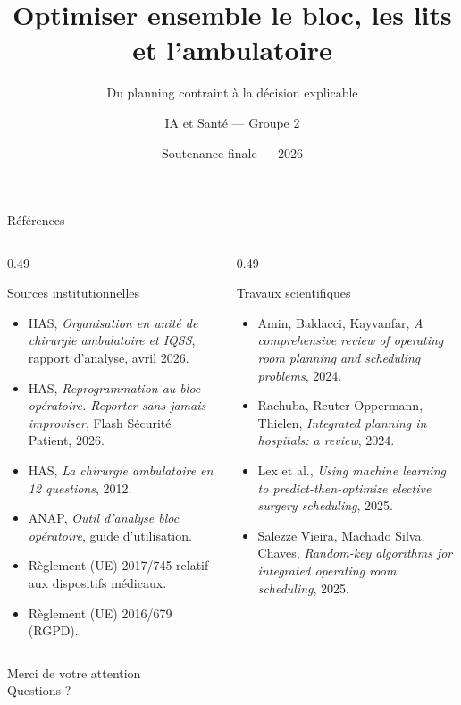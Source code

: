 \documentclass[aspectratio=169,11pt]{beamer}
\title[Bloc, lits \& ambulatoire]{Optimiser ensemble le bloc, les lits et l'ambulatoire}
\subtitle{Du planning contraint à la décision explicable}
\author[IA \& Santé --- Groupe 2]{IA et Santé --- Groupe 2}
\date{Soutenance finale --- 2026}
\begin{document}
\begin{frame}[plain]
  \titlepage
\end{frame}








\begin{frame}{Références}
  \scriptsize
  \begin{columns}[T,onlytextwidth]
    \begin{column}{0.49\textwidth}
      \begin{exampleblock}{Sources institutionnelles}
        \begin{itemize}
          \item HAS, \emph{Organisation en unité de chirurgie ambulatoire et
            IQSS}, rapport d'analyse, avril 2026.
          \item HAS, \emph{Reprogrammation au bloc opératoire. Reporter sans
            jamais improviser}, Flash Sécurité Patient, 2026.
          \item HAS, \emph{La chirurgie ambulatoire en 12 questions}, 2012.
          \item ANAP, \emph{Outil d'analyse bloc opératoire}, guide
            d'utilisation.
          \item Règlement (UE) 2017/745 relatif aux dispositifs médicaux.
          \item Règlement (UE) 2016/679 (RGPD).
        \end{itemize}
      \end{exampleblock}
    \end{column}
    \begin{column}{0.49\textwidth}
      \begin{exampleblock}{Travaux scientifiques}
        \begin{itemize}
          \item Amin, Baldacci, Kayvanfar, \emph{A comprehensive review of
            operating room planning and scheduling problems}, 2024.
          \item Rachuba, Reuter-Oppermann, Thielen, \emph{Integrated planning
            in hospitals: a review}, 2024.
          \item Lex et al., \emph{Using machine learning to
            predict-then-optimize elective surgery scheduling}, 2025.
          \item Salezze Vieira, Machado Silva, Chaves, \emph{Random-key
            algorithms for integrated operating room scheduling}, 2025.
        \end{itemize}
      \end{exampleblock}
    \end{column}
  \end{columns}
\end{frame}

{
\begin{frame}
  \begin{center}
    \Large
    Merci de votre attention\\[0.5em]
    Questions ?
  \end{center}
\end{frame}
}


\end{document}
